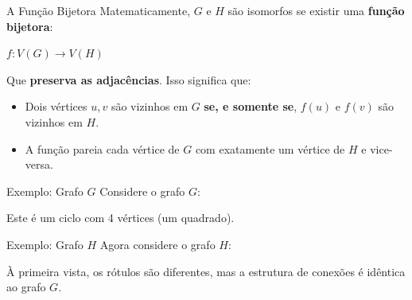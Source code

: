 \documentclass[9pt]{beamer}
\begin{document}
\begin{frame}{A Função Bijetora}
    Matematicamente, $G$ e $H$ são isomorfos se existir uma \textbf{função bijetora}:
    \vspace{0.3cm}
    \begin{center}
        \Large $f: V(G) \rightarrow V(H)$
    \end{center}
    \vspace{0.3cm}
    Que \textbf{preserva as adjacências}. Isso significa que:
    \begin{itemize}
        \item Dois vértices $u, v$ são vizinhos em $G$ \textbf{se, e somente se}, $f(u)$ e $f(v)$ são vizinhos em $H$.
        \item A função pareia cada vértice de $G$ com exatamente um vértice de $H$ e vice-versa.
    \end{itemize}
\end{frame}

\begin{frame}{Exemplo: Grafo $G$}
    Considere o grafo $G$:
    \vspace{0.5cm}
    \begin{center}
    \end{center}
    Este é um ciclo com 4 vértices (um quadrado).
\end{frame}

\begin{frame}{Exemplo: Grafo $H$}
    Agora considere o grafo $H$:
    \vspace{0.5cm}
    \begin{center}
    \end{center}
    À primeira vista, os rótulos são diferentes, mas a estrutura de conexões é idêntica ao grafo $G$.
\end{frame}
\end{document}
